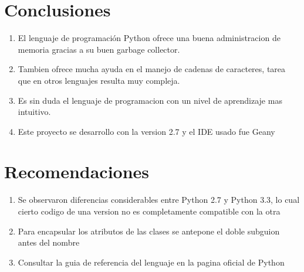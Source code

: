 \documentclass[11pt]{article}
\begin{document}
\section{\textbf{Conclusiones}}
\begin{enumerate}
\item
El lenguaje de programación Python ofrece una buena administracion de memoria gracias a su buen garbage collector.
\item
Tambien ofrece mucha ayuda en el manejo de cadenas de caracteres, tarea que en otros lenguajes resulta muy compleja.
\item
Es sin duda el lenguaje de programacion con un nivel de aprendizaje mas intuitivo.
\item
Este proyecto se desarrollo con la version 2.7 y el IDE usado fue Geany
\end{enumerate}

\section{\textbf{Recomendaciones}}
\begin{enumerate}
\item
Se observaron diferencias considerables entre Python 2.7 y Python 3.3, lo cual cierto codigo de una version no es completamente compatible con la otra
\item
Para encapsular los atributos de las clases se antepone el doble subguion antes del nombre
\item
Consultar la guia de referencia del lenguaje en la pagina oficial de Python

\end{enumerate}
\end{document}

